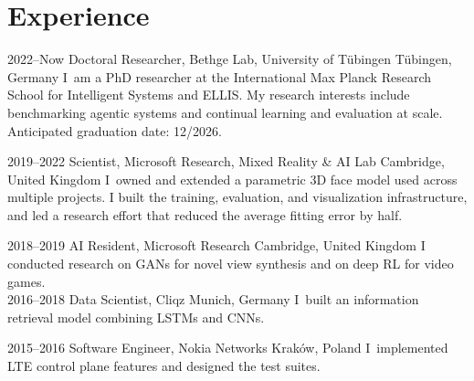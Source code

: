 \documentclass[]{friggeri-cv_osx}
\begin{document}
\vspace{2mm}

\section{Experience}
\begin{entrylist}
\entry
{2022–Now}
{Doctoral Researcher, Bethge Lab, University of Tübingen}
{Tübingen, Germany}
{I~am a PhD researcher at the International Max Planck Research School for Intelligent Systems and ELLIS. My research interests include benchmarking agentic systems and continual learning and evaluation at scale. Anticipated graduation date: 12/2026.\\}

\entry
{2019–2022}
{Scientist, Microsoft Research, Mixed Reality \& AI Lab}
{Cambridge, United Kingdom}
{I~owned and extended a parametric 3D face model used across multiple projects. I built the training, evaluation, and visualization infrastructure, and led a research effort that reduced the average fitting error by half.\\}

\entry
{2018–2019}
{AI Resident, Microsoft Research}
{Cambridge, United Kingdom}
{I conducted research on GANs for novel view synthesis and on deep RL for video games.\\}
\entry
{2016–2018}
{Data Scientist, Cliqz}
{Munich, Germany}
{I~built an information retrieval model combining LSTMs and CNNs.\\}

\entry
{2015–2016}
{Software Engineer, Nokia Networks}
{Kraków, Poland}
{I~implemented LTE control plane features and designed the test suites.\\}
\end{entrylist}
\end{document}
